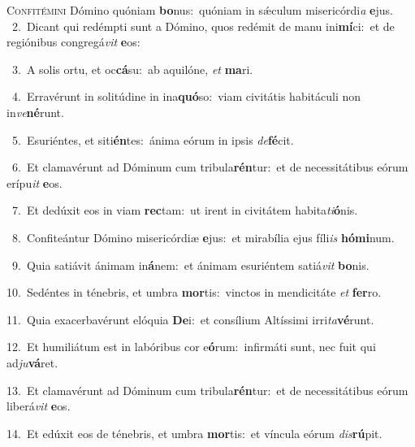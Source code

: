 \lettrine{\initial\textcolor{\initialcolor}{C}}{onfitémini} Dómino quóniam \textbf{bo}\-nus:~\star quóniam in sǽculum misericórdi\textit{a} \textbf{e}\-jus.\\
{\numbfont\textcolor{\numbcolor}{~2.}}~Dicant qui redémpti sunt a Dómino, quos redémit de manu ini\-\textbf{mí}\-ci:~\star et de regiónibus congregá\textit{vit} \textbf{e}\-os:\par
{\numbfont\textcolor{\numbcolor}{~3.}}~A solis ortu, et oc\-\textbf{cá}\-su:~\star ab aquilóne, \textit{et} \textbf{ma}\-ri.\par
{\numbfont\textcolor{\numbcolor}{~4.}}~Erravérunt in solitúdine in ina\-\textbf{quó}\-so:~\star viam civitátis habitáculi non in\-\textit{ve}\-\textbf{né}runt.\par
{\numbfont\textcolor{\numbcolor}{~5.}}~Esuriéntes, et siti\-\textbf{én}\-tes:~\star ánima eórum in ipsis \textit{de}\-\textbf{fé}cit.\par
{\numbfont\textcolor{\numbcolor}{~6.}}~Et clamavérunt ad Dóminum cum tribula\-\textbf{rén}\-tur:~\star et de necessitátibus eórum erípu\textit{it} \textbf{e}\-os.\par
{\numbfont\textcolor{\numbcolor}{~7.}}~Et dedúxit eos in viam \textbf{rec}\-tam:~\star ut irent in civitátem habita\-\textit{ti}\-\textbf{ó}nis.\par
{\numbfont\textcolor{\numbcolor}{~8.}}~Confiteántur Dómino misericórdiæ \textbf{e}\-jus:~\star et mirabília ejus fíli\textit{is} \textbf{hó}\-\textbf{mi}num.\par
{\numbfont\textcolor{\numbcolor}{~9.}}~Quia satiávit ánimam in\-\textbf{á}\-nem:~\star et ánimam esuriéntem satiá\textit{vit} \textbf{bo}\-nis.\par
{\numbfont\textcolor{\numbcolor}{10.}}~Sedéntes in ténebris, et umbra \textbf{mor}\-tis:~\star vinctos in mendicitáte \textit{et} \textbf{fer}\-ro.\par
{\numbfont\textcolor{\numbcolor}{11.}}~Quia exacerbavérunt elóquia \textbf{De}\-i:~\star et consílium Altíssimi irri\-\textit{ta}\-\textbf{vé}runt.\par
{\numbfont\textcolor{\numbcolor}{12.}}~Et humiliátum est in labóribus cor e\-\textbf{ó}\-rum:~\star infirmáti sunt, nec fuit qui ad\-\textit{ju}\-\textbf{vá}ret.\par
{\numbfont\textcolor{\numbcolor}{13.}}~Et clamavérunt ad Dóminum cum tribula\-\textbf{rén}\-tur:~\star et de necessitátibus eórum liberá\textit{vit} \textbf{e}\-os.\par
{\numbfont\textcolor{\numbcolor}{14.}}~Et edúxit eos de ténebris, et umbra \textbf{mor}\-tis:~\star et víncula eórum \textit{dis}\-\textbf{rú}pit.\par
